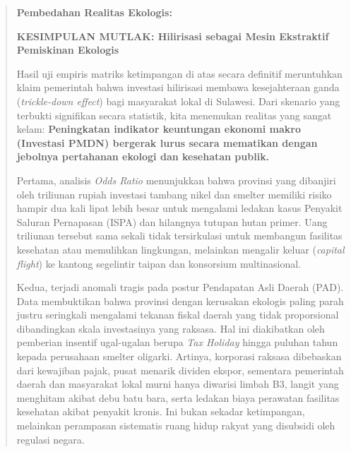 \documentclass[
]{article}
\begin{document}
\begin{quote}
\textbf{Pembedahan Realitas Ekologis:}

\textbf{KESIMPULAN MUTLAK: Hilirisasi sebagai Mesin Ekstraktif
Pemiskinan Ekologis}

Hasil uji empiris matriks ketimpangan di atas secara definitif
meruntuhkan klaim pemerintah bahwa investasi hilirisasi membawa
kesejahteraan ganda (\emph{trickle-down effect}) bagi masyarakat lokal
di Sulawesi. Dari skenario yang terbukti signifikan secara statistik,
kita menemukan realitas yang sangat kelam: \textbf{Peningkatan indikator
keuntungan ekonomi makro (Investasi PMDN) bergerak lurus secara
mematikan dengan jebolnya pertahanan ekologi dan kesehatan publik.}

Pertama, analisis \emph{Odds Ratio} menunjukkan bahwa provinsi yang
dibanjiri oleh triliunan rupiah investasi tambang nikel dan smelter
memiliki risiko hampir dua kali lipat lebih besar untuk mengalami
ledakan kasus Penyakit Saluran Pernapasan (ISPA) dan hilangnya tutupan
hutan primer. Uang triliunan tersebut sama sekali tidak tersirkulasi
untuk membangun fasilitas kesehatan atau memulihkan lingkungan,
melainkan mengalir keluar (\emph{capital flight}) ke kantong segelintir
taipan dan konsorsium multinasional.

Kedua, terjadi anomali tragis pada postur Pendapatan Asli Daerah (PAD).
Data membuktikan bahwa provinsi dengan kerusakan ekologis paling parah
justru seringkali mengalami tekanan fiskal daerah yang tidak
proporsional dibandingkan skala investasinya yang raksasa. Hal ini
diakibatkan oleh pemberian insentif ugal-ugalan berupa \emph{Tax
Holiday} hingga puluhan tahun kepada perusahaan smelter oligarki.
Artinya, korporasi raksasa dibebaskan dari kewajiban pajak, pusat
menarik dividen ekspor, sementara pemerintah daerah dan masyarakat lokal
murni hanya diwarisi limbah B3, langit yang menghitam akibat debu batu
bara, serta ledakan biaya perawatan fasilitas kesehatan akibat penyakit
kronis. Ini bukan sekadar ketimpangan, melainkan perampasan sistematis
ruang hidup rakyat yang disubsidi oleh regulasi negara.
\end{quote}
\end{document}
